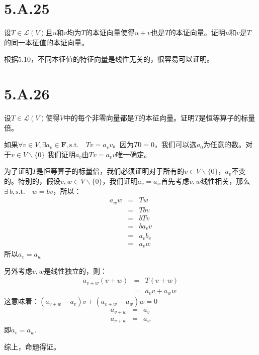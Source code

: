 \documentclass[10pt,a4paper,UTF8]{article}
\begin{document}
\section{5.A.25}
\label{sec:org799ea63}


\begin{problem}
设\(T\in \mathcal{L}(V)\)且\(u\)和\(v\)均为\(T\)的本证向量使得\(u+v\)也是\(T\)的本证向量。证明\(u\)和\(v\)是\(T\)的同一本征值的本证向量。
\end{problem}

\begin{answer}
根据5.10，不同本征值的特征向量是线性无关的，很容易可以证明。
\end{answer}

\section{5.A.26}
\label{sec:org416c0f9}


\begin{problem}
设\(T\in \mathcal{L}(V)\)使得\(V\)中的每个非零向量都是\(T\)的本征向量。证明\(T\)是恒等算子的标量倍。
\end{problem}

\begin{answer}
如果\(\forall v\in V, \exists a_{v}\in \mathbf{F}, \mathrm{s.t.} \quad Tv = a_{v} v\)。因为\(T0 = 0\)，我们可以选\(a_{0}\)为任意的数。对于\(v\in V\backslash \{0\}\) 我们证明\(a_{v}\)由\(Tv = a_{v}v\)唯一确定。

为了证明\(T\)是恒等算子的标量倍，我们必须证明对于所有的\(v\in V\backslash \{0\}\)，\(a_{v}\)不变的。特别的，假设\(v,w \in V\backslash \{0\}\)，我们证明\(a_{v}=a_{w}\)首先考虑\(v,w\)线性相关，那么\(\exists~b, \mathrm{s.t.}\quad w=bv\)，所以：
\begin{eqnarray}
\label{eq:21}
a_{w}w&=&Tw \\
&=&Tbv \\
&=&bTv \\
&=&ba_{v}v \\
&=&a_{v}b_{v}\\
&=&a_{v}w
\end{eqnarray}
所以\(a_{v} = a_{w}\)

另外考虑\(v,w\)是线性独立的，则：
\begin{eqnarray}
\label{eq:23}
a_{v+w}(v+w)&=&T(v + w) \\
&=&a_{v}v + a_{w}w
\end{eqnarray}
这意味着：\((a_{v+w} - a_{v})v + (a_{v+w} - a_{w})w = 0\)
\begin{eqnarray}
\label{eq:24}
a_{v+w}&=&a_{v} \\
a_{v+w}&=&a_{w}
\end{eqnarray}
即\(a_{v}=a_{w}\).

综上，命题得证。
\end{answer}
\end{document}
